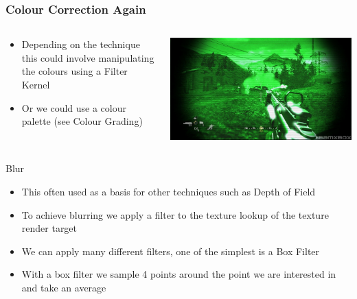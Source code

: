 \begin{frame}
	\frametitle{Colour Correction Again}
		\begin{columns}
		\begin{column}{0.5\textwidth}
			\begin{itemize}
				\item Depending on the technique this could involve manipulating the colours using a Filter Kernel
				\item Or we could use a colour palette (see Colour Grading) 
			\end{itemize}
		\end{column}
		\begin{column}{0.5\textwidth} 
			\begin{center}
				\includegraphics[width=\textwidth]{colour_correction_nightvision}
			\end{center}
		\end{column}
	\end{columns}
\end{frame}

\begin{frame}{Blur}
	\begin{itemize}
		\item\pause This often used as a basis for other techniques such as Depth of Field
		\item\pause To achieve blurring we apply a filter to the texture lookup of the texture render target
		\item\pause We can apply many different filters, one of the simplest is a Box Filter
		\item\pause With a box filter we sample 4 points around the point we are interested in and take an average
	\end{itemize}
\end{frame}

